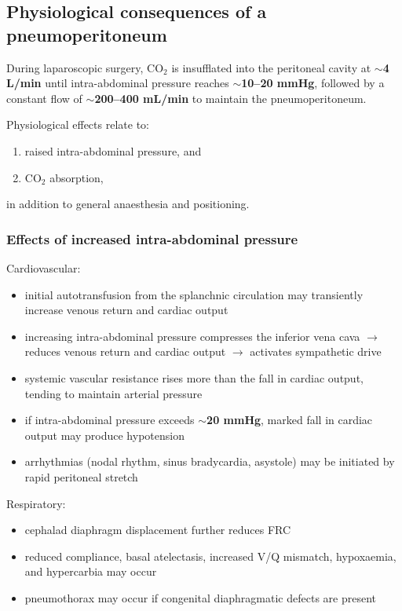 \documentclass[11pt,a4paper]{article}
\begin{document}
\subsection{Physiological consequences of a pneumoperitoneum}
During laparoscopic surgery, CO$_2$ is insufflated into the peritoneal cavity at \textbf{$\sim$4 L/min} until intra-abdominal pressure reaches \textbf{$\sim$10--20 mmHg}, followed by a constant flow of \textbf{$\sim$200--400 mL/min} to maintain the pneumoperitoneum.

Physiological effects relate to:
\begin{enumerate}
\item raised intra-abdominal pressure, and
\item CO$_2$ absorption,
\end{enumerate}
in addition to general anaesthesia and positioning.

\subsubsection{Effects of increased intra-abdominal pressure}
Cardiovascular:
\begin{itemize}
\item initial autotransfusion from the splanchnic circulation may transiently increase venous return and cardiac output
\item increasing intra-abdominal pressure compresses the inferior vena cava $\rightarrow$ reduces venous return and cardiac output $\rightarrow$ activates sympathetic drive
\item systemic vascular resistance rises more than the fall in cardiac output, tending to maintain arterial pressure
\item if intra-abdominal pressure exceeds \textbf{$\sim$20 mmHg}, marked fall in cardiac output may produce hypotension
\item arrhythmias (nodal rhythm, sinus bradycardia, asystole) may be initiated by rapid peritoneal stretch
\end{itemize}

Respiratory:
\begin{itemize}
\item cephalad diaphragm displacement further reduces FRC
\item reduced compliance, basal atelectasis, increased V/Q mismatch, hypoxaemia, and hypercarbia may occur
\item pneumothorax may occur if congenital diaphragmatic defects are present
\end{itemize}
\end{document}
